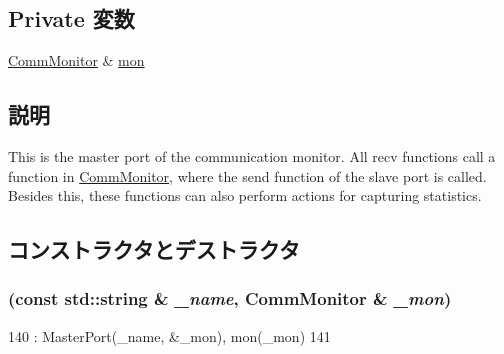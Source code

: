\subsection*{Private 変数}
\begin{DoxyCompactItemize}
\item 
\hyperlink{classCommMonitor_1_1CommMonitor}{CommMonitor} \& \hyperlink{classCommMonitor_1_1MonitorMasterPort_ab6833d8d55cb403502472c073464905b}{mon}
\end{DoxyCompactItemize}


\subsection{説明}
This is the master port of the communication monitor. All recv functions call a function in \hyperlink{classCommMonitor_1_1CommMonitor}{CommMonitor}, where the send function of the slave port is called. Besides this, these functions can also perform actions for capturing statistics. 

\subsection{コンストラクタとデストラクタ}
\hypertarget{classCommMonitor_1_1MonitorMasterPort_ad1e9ab98eaca885ba1511068ee61ab87}{
\subsubsection[{MonitorMasterPort}]{ (const std::string \& {\em \_\-name}, \/  {\bf CommMonitor} \& {\em \_\-mon})}}
\label{classCommMonitor_1_1MonitorMasterPort_ad1e9ab98eaca885ba1511068ee61ab87}



\begin{DoxyCode}
140             : MasterPort(_name, &_mon), mon(_mon)
141         { }
\end{DoxyCode}


